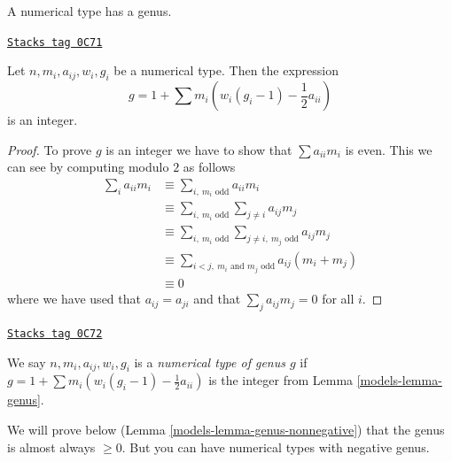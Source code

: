 A numerical type has a genus.

\begin{lemma}[Genus]
\label{models-lemma-genus}
\href{https://stacks.math.columbia.edu/tag/0C71}{\texttt{Stacks tag 0C71}}

Let $n, m_i, a_{ij}, w_i, g_i$ be a numerical type. Then the expression
$$
g = 1 + \sum m_i(w_i(g_i - 1) - \frac{1}{2} a_{ii})
$$
is an integer.
\end{lemma}

\begin{proof}
To prove $g$ is an integer we have to show that $\sum a_{ii}m_i$ is even.
This we can see by computing modulo $2$ as follows
\begin{align*}
\sum\nolimits_i a_{ii} m_i
& \equiv
\sum\nolimits_{i,\ m_i\text{ odd}} a_{ii}m_i \\
& \equiv
\sum\nolimits_{i,\ m_i\text{ odd}} \sum\nolimits_{j \not = i} a_{ij}m_j \\
& \equiv
\sum\nolimits_{i,\ m_i\text{ odd}}
\sum\nolimits_{j \not = i,\ m_j\text{ odd}} a_{ij}m_j \\
& \equiv
\sum\nolimits_{i < j,\ m_i\text{ and }m_j\text{ odd}} a_{ij}(m_i + m_j) \\
& \equiv
0
\end{align*}
where we have used that $a_{ij} = a_{ji}$ and that $\sum_j a_{ij}m_j = 0$
for all $i$.
\end{proof}

\begin{definition}[Genus]
\label{models-definition-genus}
\href{https://stacks.math.columbia.edu/tag/0C72}{\texttt{Stacks tag 0C72}}

We say $n, m_i, a_{ij}, w_i, g_i$ is a {\it numerical type of genus $g$}
if $g = 1 + \sum m_i(w_i(g_i - 1) - \frac{1}{2} a_{ii})$ is the integer
from Lemma \ref{models-lemma-genus}.
\end{definition}

We will prove below (Lemma \ref{models-lemma-genus-nonnegative}) that the genus
is almost always $\geq 0$. But you can have numerical types with
negative genus.

